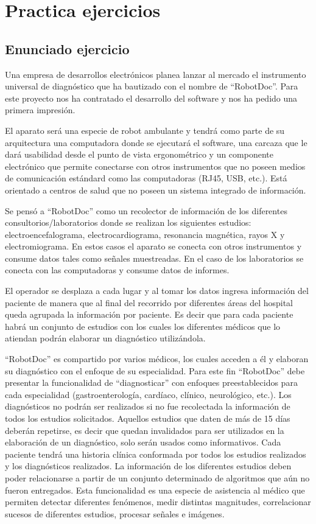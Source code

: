 \section{Practica ejercicios}
\subsection*{Enunciado ejercicio}
Una empresa de desarrollos electrónicos planea lanzar al mercado el instrumento universal de diagnóstico 
que ha bautizado con el nombre de “RobotDoc”. Para este proyecto nos ha contratado el desarrollo del 
software y nos ha pedido una primera impresión. 

\medskip
El aparato será una especie de robot ambulante y tendrá como parte de su arquitectura una computadora 
donde se ejecutará el software, una carcaza que le dará usabilidad desde el punto de vista ergonométrico y un
componente electrónico que permite conectarse con otros instrumentos que no poseen medios de 
comunicación estándard como las computadoras (RJ45, USB, etc.). Está orientado a centros de salud que no 
poseen un sistema integrado de información.

\medskip
Se pensó a “RobotDoc” como un recolector de información de los diferentes consultorios/laboratorios donde 
se realizan los siguientes estudios: electroencefalograma, electrocardiograma, resonancia magnética, rayos X
y electromiograma. En estos casos el aparato se conecta con otros instrumentos y consume datos tales como 
señales muestreadas. En el caso de los laboratorios se conecta con las computadoras y consume datos de 
informes.

\medskip
El operador se desplaza a cada lugar y al tomar los datos ingresa información del paciente de manera que al 
final del recorrido por diferentes áreas del hospital queda agrupada la información por paciente. Es decir que 
para cada paciente habrá un conjunto de estudios con los cuales los diferentes médicos que lo atiendan 
podrán elaborar un diagnóstico utilizándola. 

\medskip
“RobotDoc” es compartido por varios médicos, los cuales acceden a él y elaboran su diagnóstico con el 
enfoque de su especialidad. Para este fin “RobotDoc” debe presentar la funcionalidad de “diagnosticar” con 
enfoques preestablecidos para cada especialidad (gastroenterología, cardíaco, clínico, neurológico, etc.). Los 
diagnósticos no podrán ser realizados si no fue recolectada la información de todos los estudios solicitados. 
Aquellos estudios que daten de más de 15 días deberán repetirse, es decir que quedan invalidados para ser 
utilizados en la elaboración de un diagnóstico, solo serán usados como informativos. Cada paciente tendrá 
una historia clínica conformada por todos los estudios realizados y los diagnósticos realizados.
La información de los diferentes estudios deben poder relacionarse a partir de un conjunto determinado de 
algoritmos que aún no fueron entregados. Esta funcionalidad es una especie de asistencia al médico que 
permiten detectar diferentes fenómenos, medir distintas magnitudes, correlacionar sucesos de diferentes 
estudios, procesar señales e imágenes. 

